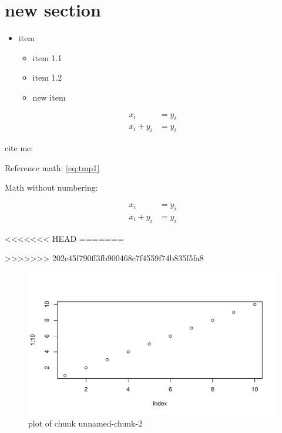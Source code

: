 \section{new section}\label{new-section}

\begin{itemize}
\itemsep1pt\parskip0pt
\item
  item

  \begin{itemize}
  \itemsep1pt\parskip0pt
  \item
    item 1.1
  \item
    item 1.2
  \item
    new item
  \end{itemize}
\end{itemize}

\begin{align}
x_i &= y_i \label{eq:tmp1}\\
x_i + y_i &= y_i
\end{align}

cite me: \textcite{Abb97}

Reference math: \eqref{eq:tmp1}

Math without numbering:

\begin{align*}
x_i &= y_i \\
x_i + y_i &= y_i
\end{align*}

\begin{Shaded}
\begin{Highlighting}[]
\StringTok{ }
<<<<<<< HEAD
\NormalTok{(}\NormalTok{:}\NormalTok{)}
=======
\end{Highlighting}
\end{Shaded}

\begin{Shaded}
\begin{Highlighting}[]
\NormalTok{(}\NormalTok{(} \NormalTok{:}\NormalTok{, } \NormalTok{:}\NormalTok{)) +}\StringTok{ }
\StringTok{  }\NormalTok{(}\StringTok{ }
\StringTok{  }\NormalTok{()}
>>>>>>> 202c45f790ff3fb900468c7f4559f74b835f5fa8
\end{Highlighting}
\end{Shaded}

\begin{figure}[htbp]
\centering
\includegraphics{figs/test/unnamed-chunk-2-1.pdf}
\caption{plot of chunk unnamed-chunk-2}
\end{figure}
